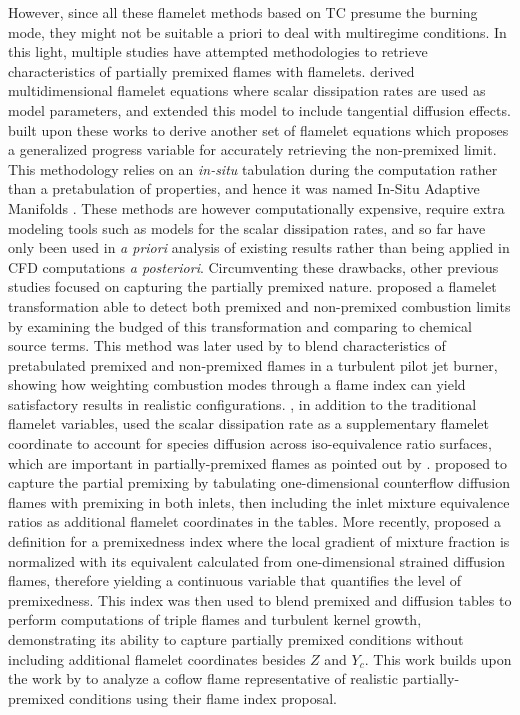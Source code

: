 \documentclass[preprint,12pt,authoryear]{elsarticle}
\begin{document}
However, since all these flamelet methods based on TC presume the burning mode, they might not be suitable a priori to deal with multiregime conditions. In this light, multiple studies have attempted methodologies to retrieve characteristics of partially premixed flames with flamelets. \cite{nguyen_multidimensional_2010} derived multidimensional flamelet equations where scalar dissipation rates are used as model parameters, and \cite{scholtissek_derivation_2020} extended this model to include tangential diffusion effects. \cite{mueller_physically-derived_2020} built upon these works to derive another set of flamelet equations which proposes a generalized progress variable for accurately retrieving the non-premixed limit. This methodology relies on an \textsl{in-situ} tabulation during the computation rather than a pretabulation of properties, and hence it was named In-Situ Adaptive Manifolds \citep{novoselov_two-dimensional_2021}. These methods are however computationally expensive, require extra modeling tools such as models for the scalar dissipation rates, and so far have only been used in \textsl{a priori} analysis of existing results rather than being applied in CFD computations \textsl{a posteriori}. Circumventing these drawbacks, other previous studies focused on capturing the partially premixed nature. \cite{knudsen_general_2009} proposed a flamelet transformation able to detect both premixed and non-premixed combustion limits by examining the budged of this transformation and comparing to chemical source terms. This method was later used by \cite{kleinheinz_computational_2017} to blend characteristics of pretabulated premixed and non-premixed flames in a turbulent pilot jet burner, showing how weighting combustion modes through a flame index can yield satisfactory results in realistic configurations. \cite{franzelli_tabulated_2013}, in addition to the traditional flamelet variables, used the scalar dissipation rate as a supplementary flamelet coordinate to account for species diffusion across iso-equivalence ratio surfaces, which are important in partially-premixed flames as pointed out by \cite{fiorina_approximating_2005}. \cite{wen_generalized_2018} proposed to capture the partial premixing by tabulating one-dimensional counterflow diffusion flames with premixing in both inlets, then including the inlet mixture equivalence ratios as additional flamelet coordinates in the tables. More recently, \cite{illana_extended_2021} proposed a definition for a premixedness index where the local gradient of mixture fraction is normalized with its equivalent calculated from one-dimensional strained diffusion flames, therefore yielding a continuous variable that quantifies the level of premixedness. This index was then used to blend premixed and diffusion tables to perform computations of triple flames and turbulent kernel growth, demonstrating its ability to capture partially premixed conditions without including additional flamelet coordinates besides $Z$ and $Y_c$. This work builds upon the work by \cite{illana_extended_2021} to analyze a coflow flame representative of realistic partially-premixed conditions using their flame index proposal.
\end{document}
